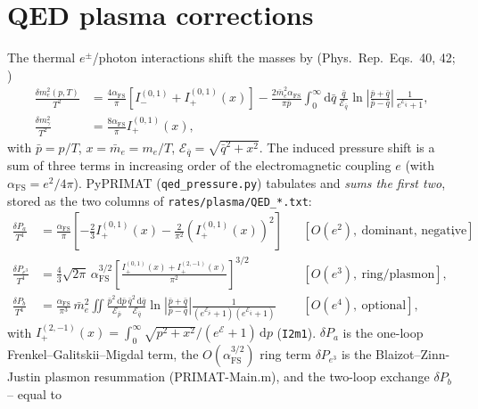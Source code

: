 \documentclass[11pt,a4paper]{article}
\newcommand{\dd}{\mathrm{d}}
\newcommand{\code}[1]{\texttt{#1}}
\newcommand{\PR}{Phys.\ Rep.}
\newcommand{\afs}{\alpha_{\mathrm{FS}}}
\begin{document}
\section{QED plasma corrections}\label{app:qed}
The thermal $e^\pm$/photon interactions shift the masses by (\PR\ Eqs.~40, 42;
\cite{Mangano2001,LopezTurner1998})
\begin{equation}
\begin{aligned}
  \frac{\delta m_e^2(p,T)}{T^2} &= \frac{4\afs}{\pi}\left[I^{(0,1)}_- + I^{(0,1)}_+(x)\right]
     - \frac{2\bar m_e^2\afs}{\pi\bar p}\!\int_0^\infty\!\dd\bar q\,
       \frac{\bar q}{\mathcal{E}_{\bar q}}
       \ln\!\left|\frac{\bar p+\bar q}{\bar p-\bar q}\right|\,
       \frac{1}{e^{\mathcal{E}_{\bar q}}+1},\\
  \frac{\delta m_\gamma^2}{T^2} &= \frac{8\afs}{\pi}I^{(0,1)}_+(x),
\end{aligned}
\end{equation}
with $\bar p=p/T$, $x=\bar m_e=m_e/T$, $\mathcal{E}_{\bar q}=\sqrt{\bar q^2+x^2}$.
The induced pressure shift is a sum of three terms in increasing order of the
electromagnetic coupling $e$ (with $\afs=e^2/4\pi$). PyPRIMAT
(\code{qed\_pressure.py}) tabulates and \emph{sums the first two}, stored as the
two columns of \code{rates/plasma/QED\_*.txt}:
\begin{align}
  \frac{\delta P_a}{T^4} &= \frac{\afs}{\pi}\!\left[
     -\frac{2}{3}I^{(0,1)}_+(x) - \frac{2}{\pi^2}\left(I^{(0,1)}_+(x)\right)^2\right]
     && [O(e^2),\ \text{dominant, negative}],\\
  \frac{\delta P_{e^3}}{T^4} &= \frac{4}{3}\sqrt{2\pi}\,\afs^{3/2}
     \left[\frac{I^{(0,1)}_+(x)+I^{(2,-1)}_+(x)}{\pi^2}\right]^{3/2}
     && [O(e^3),\ \text{ring/plasmon}],\\
  \frac{\delta P_b}{T^4} &= \frac{\afs}{\pi^3}\,\bar m_e^2\!
     \iint\!\frac{\bar p^2\,\dd\bar p}{\mathcal{E}_{\bar p}}
     \frac{\bar q^2\,\dd\bar q}{\mathcal{E}_{\bar q}}
     \ln\!\left|\frac{\bar p+\bar q}{\bar p-\bar q}\right|
     \frac{1}{(e^{\mathcal{E}_{\bar p}}+1)(e^{\mathcal{E}_{\bar q}}+1)}
     && [O(e^4),\ \text{optional}],
\end{align}
with $I^{(2,-1)}_+(x)=\int_0^\infty\!\sqrt{p^2+x^2}/(e^{\mathcal{E}}+1)\,\dd p$
(\code{I2m1}). $\delta P_a$ is the one-loop Frenkel--Galitskii--Migdal term, the
$O(\afs^{3/2})$ ring term $\delta P_{e^3}$ is the Blaizot--Zinn-Justin plasmon
resummation (PRIMAT-Main.m), and the two-loop exchange $\delta P_b$ -- equal to
\end{document}
